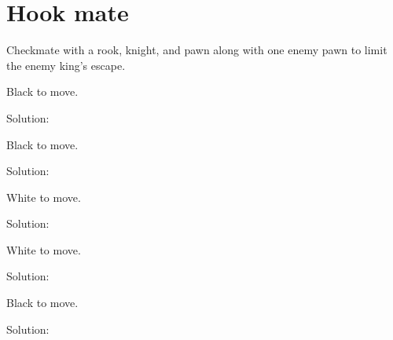 \documentclass{book}
\begin{document}
\section{Hook mate}
Checkmate with a rook, knight, and pawn along with one enemy pawn to limit the enemy king's escape.\begin{multicols}{2} 
\begin{samepage} 
\newgame 


 
\showboard
 
 Black to move. 
 
Solution: 
 
\end{samepage}\begin{samepage} 
\newgame 


 
\showboard
 
 Black to move. 
 
Solution: 
 
\end{samepage}\begin{samepage} 
\newgame 


 
\showboard
 
 White to move. 
 
Solution: 
 
\end{samepage}\begin{samepage} 
\newgame 


 
\showboard
 
 White to move. 
 
Solution: 
 
\end{samepage}\begin{samepage} 
\newgame 


 
\showboard
 
 Black to move. 
 
Solution: 
 
\end{samepage}\begin{samepage} 
\newgame 


\end{samepage}
\end{multicols}
\end{document}
